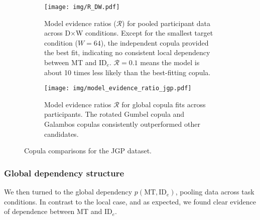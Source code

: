 \documentclass[acmlarge, manuscript,review]{acmart}
\newcommand{\mt}{\ensuremath{{\text{MT}}}\xspace}
\newcommand{\ide}{\ensuremath{{\text{ID}_e}}\xspace}
\begin{document}



\begin{figure}[htbp]
	\begin{subfigure}[c]{.48\textwidth}
	\centering
	\texttt{[image: img/R\_DW.pdf]}
	\caption{Model evidence ratios ($\mathcal{R}$) for pooled participant data across D$\times$W conditions. Except for the smallest target condition ($W=64$), the independent copula provided the best fit, indicating no consistent local dependency between MT and \ide. $\mathcal{R}=0.1$ means the model is about 10 times less likely than the best-fitting copula.}
	\label{fig:copula_fit_jgp_dw}
	\end{subfigure}
	\hfill
	\begin{subfigure}[c]{.48\textwidth}
	\centering
	\texttt{[image: img/model\_evidence\_ratio\_jgp.pdf]}
	\caption{Model evidence ratios $\mathcal{R}$ for global copula fits across participants. The rotated Gumbel copula and Galambos copulas consistently outperformed other candidates.}
	\label{fig:copulas_jgp}
	\end{subfigure}
	\caption{Copula comparisons for the JGP dataset.}
	
\end{figure}



\subsubsection{Global dependency structure}
We then turned to the global dependency $p(\mt, \ide)$, pooling data across task conditions. In contrast to the local case, and as expected, we found clear evidence of dependence between MT and \ide. 
\end{document}
